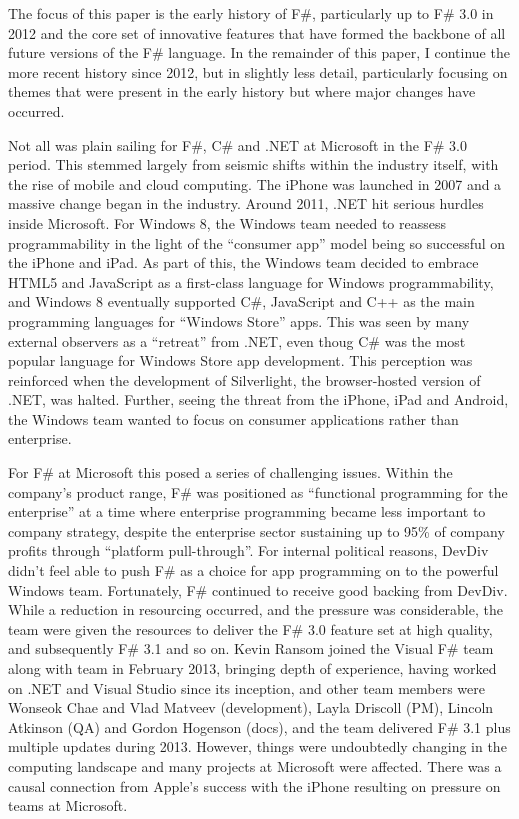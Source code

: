 \documentclass[acmsmall]{acmart}\settopmatter{}
\begin{document}
The focus of this paper is the early history of F\#, particularly up to F\# 3.0 in 2012 and the core set of innovative
features that have formed the backbone of all future versions of the F\# language. In the remainder of this paper, I
continue the more recent history since 2012, but in slightly less detail, particularly focusing on themes that were
present in the early history but where major changes have occurred.

Not all was plain sailing for F\#, C\# and .NET at Microsoft in the F\# 3.0 period.  This stemmed largely from seismic
shifts within the industry itself, with the rise of mobile and cloud computing.  The iPhone was launched in 2007 and a
massive change began in the industry. Around 2011, .NET hit serious hurdles inside Microsoft. For Windows 8, the
Windows team needed to reassess programmability in the light of the “consumer app” model being so successful on the
iPhone and iPad. As part of this, the Windows team decided to embrace HTML5 and JavaScript as a first-class language
for Windows programmability, and Windows 8 eventually supported C\#, JavaScript and C++ as the main programming
languages for “Windows Store” apps.  This was seen by many external observers as a “retreat” from .NET, even thoug
 C\# was the most popular language for Windows Store app development. This perception was reinforced when the
development of Silverlight, the browser-hosted version of .NET, was halted. Further, seeing the threat from the iPhone,
iPad and Android, the Windows team wanted to focus on consumer applications rather than enterprise.  

For F\# at Microsoft this posed a series of challenging issues. Within the company’s product range, F\# was positioned
as “functional programming for the enterprise” at a time where enterprise programming became less important to company
strategy, despite the enterprise sector sustaining up to 95\% of company profits through “platform pull-through”. For internal
political reasons, DevDiv didn’t feel able to push F\# as a choice for app programming on to the powerful Windows team.
Fortunately, F\# continued to receive good backing from DevDiv. While a reduction in resourcing occurred, and the pressure
was considerable, the team were given the resources to deliver the F\# 3.0 feature set at high quality, and
subsequently F\# 3.1 and so on.  Kevin Ransom joined the Visual F\# team along with team in February 2013, bringing depth of experience, having
worked on .NET and Visual Studio since its inception, and other team members were Wonseok Chae and Vlad Matveev (development), Layla Driscoll (PM),
Lincoln Atkinson (QA) and Gordon Hogenson (docs), and the team delivered F\# 3.1 plus multiple updates during 2013.
However, things were undoubtedly changing in the computing landscape and many
projects at Microsoft were affected. There was a causal connection from Apple's success with the iPhone resulting on pressure
on teams at Microsoft.  
\end{document}
